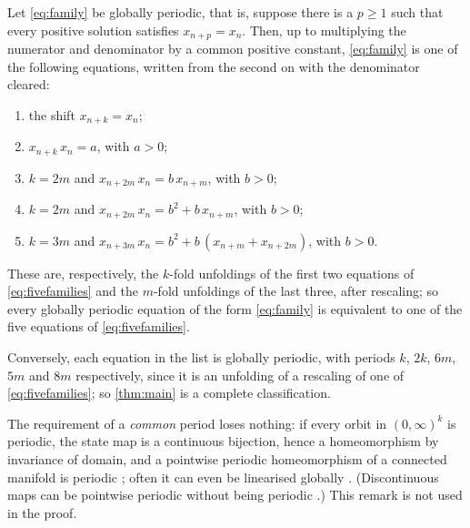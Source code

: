 \begin{theorem}
\label{thm:main}
Let \eqref{eq:family} be globally periodic, that is, suppose there is a
$p\ge1$ such that every positive solution satisfies $x_{n+p}=x_n$. Then,
up to multiplying the numerator and denominator by a common positive
constant, \eqref{eq:family} is one of the following equations, written from
the second on with the denominator cleared:
\begin{enumerate}
\item the shift $x_{n+k}=x_n$;
\item $x_{n+k}\,x_n=a$, with $a>0$;
\item $k=2m$ and $x_{n+2m}\,x_n=b\,x_{n+m}$, with $b>0$;
\item $k=2m$ and $x_{n+2m}\,x_n=b^2+b\,x_{n+m}$, with $b>0$;
\item $k=3m$ and $x_{n+3m}\,x_n=b^2+b\,(x_{n+m}+x_{n+2m})$, with $b>0$.
\end{enumerate}
These are, respectively, the $k$-fold unfoldings of the first two
equations of \eqref{eq:fivefamilies} and the $m$-fold unfoldings of the
last three, after rescaling; so every globally periodic equation of the
form \eqref{eq:family} is equivalent to one of the five equations of
\eqref{eq:fivefamilies}.
\end{theorem}

Conversely, each equation in the list is globally periodic, with periods
$k$, $2k$, $6m$, $5m$ and $8m$ respectively, since it is an unfolding of a
rescaling of one of \eqref{eq:fivefamilies}; so \autoref{thm:main} is a
complete classification.

The requirement of a \emph{common} period loses nothing: if every orbit in
$(0,\infty)^k$ is periodic, the state map is a continuous bijection, hence a
homeomorphism by invariance of domain, and a pointwise periodic homeomorphism
of a connected manifold is periodic \citep{Montgomery1937}; often it can even
be linearised globally \citep{CimaGasullManosas2012}. (Discontinuous maps can
be pointwise periodic without being periodic
\citep{CimaGasullManosaManosas2022}.) This remark is not used in the proof.

